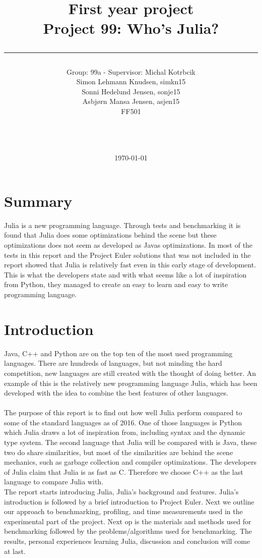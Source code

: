 \documentclass[a4paper, 11pt, titlepage]{article}
\title{First year project\\Project 99: Who's Julia?\\\rule{10cm}{0.5mm}}
\author{Group: 99a - Supervisor: Michal Kotrbcik\\Simon Lehmann Knudsen, simkn15\\Sonni Hedelund Jensen, sonje15\\Asbjørn Mansa Jensen, asjen15
	\\ FF501\\\rule{5.5cm}{0.5mm}\\}
\date{\today}
\begin{document}
\maketitle

\vfill

\newpage
{}
\section{Summary}
Julia is a new programming language. Through tests and benchmarking it is found that Julia does some optimizations behind the scene but these optimizations does not seem as developed as Javas optimizations. In most of the tests in this report and the Project Euler solutions that was not included in the report showed that Julia is relatively fast even in this early stage of development. This is what the developers state and with what seems like a lot of inspiration from Python, they managed to create an easy to learn and easy to write programming language.

\newpage
\tableofcontents

\newpage
{}
\pagestyle{fancy}
\fancyhf{}
\section{Introduction}
Java, C++ and Python are on the top ten of the most used programming languages. There are hundreds of languages, but not minding the hard competition, new languages are still created with the thought of doing better. An example of this is the relatively new programming language Julia, which has been developed with the idea to combine the best features of other languages.\\
\\
The purpose of this report is to find out how well Julia perform compared to some of the standard languages as of 2016. One of those languages is Python which Julia draws a lot of inspiration from, including syntax and the dynamic type system. The second language that Julia will be compared with is Java, these two do share similarities, but most of the similarities are behind the scene mechanics, such as garbage collection and compiler optimizations. The developers of Julia claim that Julia is as fast as C. Therefore we choose C++ as the last language to compare Julia with.
\\
The report starts introducing Julia, Julia's background and features. Julia's introduction is followed by a brief introduction to Project Euler. Next we outline our approach to benchmarking, profiling, and time measurements used in the experimental part of the project. Next op is the materials and methods used for benchmarking followed by the problems/algorithms used for benchmarking. The results, personal experiences learning Julia, discussion and conclusion will come at last. 
\end{document}
